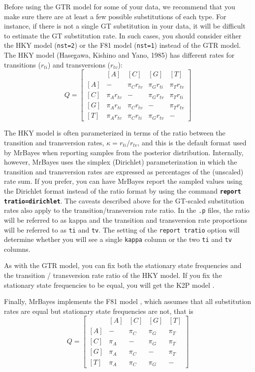 \documentclass[12pt]{book}
\newcommand{\ttt}[1]{\texttt{#1}}
\newcommand{\tb}[1]{\ttt{\textbf{#1}}}
\begin{document}
Before using the GTR model for some of your data, we recommend that you make sure there are at
least a few possible substitutions of each type. For instance, if there is not a single GT
substitution in your data, it will be difficult to estimate the GT substitution rate. In such
cases, you should consider either the HKY model (\ttt{nst=2}) or the F81 model (\ttt{nst=1})
instead of the GTR model. The HKY model (Hasegawa, Kishino and Yano, 1985) has different rates for
transitions ($r_{ti}$) and transversions ($r_{tv}$):
\[ Q=\begin{bmatrix} 
    & [A] & [C] & [G] & [T]\\
 [A]& - & \pi_C r_{tv} & \pi_G r_{ti} & \pi_T r_{tv}\\
 [C]& \pi_A r_{tv} & - & \pi_G r_{tv} & \pi_T r_{ti}\\
 [G]& \pi_A r_{ti} & \pi_C r_{tv} & - & \pi_T r_{tv}\\
 [T]& \pi_A r_{tv} & \pi_C r_{ti} & \pi_G r_{tv} & - 
\end{bmatrix}
\]

The HKY model is often parameterized in terms of the ratio between the transition and transversion
rates, $\kappa = r_{ti}/r_{tv}$, and this is the default format used by MrBayes when reporting
samples from the posterior distribution. Internally, however, MrBayes uses the simplex (Dirichlet)
parameterization in which the transition and transversion rates are expressed as percentages of the
(unscaled) rate sum. If you prefer, you can have MrBayes report the sampled values using the
Dirichlet format instead of the ratio format by using the command \tb{report tratio=dirichlet}. The
caveats described above for the GT-scaled substitution rates also apply to the
transition/transversion rate ratio. In the \ttt{.p} files, the ratio will be referred to as kappa
and the transition and transversion rate proportions will be referred to as \ttt{ti} and \ttt{tv}.
The setting of the \ttt{report tratio} option will determine whether you will see a single
\ttt{kappa} column or the two \ttt{ti} and \ttt{tv} columns.

As with the GTR model, you can fix both the stationary state frequencies and the transition /
transversion rate ratio of the HKY model. If you fix the stationary state frequencies to be equal,
you will get the K2P model \citep{kimura80}.

Finally, MrBayes implements the F81 model \citep{felsenstein81}, which assumes that all
substitution rates are equal but stationary state frequencies are not, that is
\[
Q=\begin{bmatrix}
    & [A] & [C] & [G] & [T] \\
 [A]& - & \pi_C & \pi_G & \pi_T\\
 [C]& \pi_A & - & \pi_G &\pi_T \\
 [G]& \pi_A & \pi_C& - & \pi_T\\
 [T]& \pi_A & \pi_C&\pi_G  & -
\end{bmatrix}
\]
\end{document}
